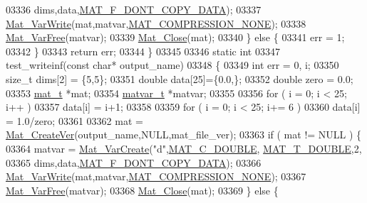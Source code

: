 \begin{DoxyCode}
{{{{{{{{{{{{{{{{{{{{{{{{{{{{{{{{{{{{{{{{{{{{{{{{{{{{{{{{{{{{03336                        dims,data,\hyperlink{group___m_a_t_ggab9d6ef9e3ddca78a317b173f01d53fbba762244499f52eb35e7b53fb79a1f2889}{MAT\_F\_DONT\_COPY\_DATA});
03337         \hyperlink{group___m_a_t_ga4bd3eba12df415d8226e27c457fbbb0b}{Mat\_VarWrite}(mat,matvar,\hyperlink{group___m_a_t_gga768c318af97bd2567758ecb001ceb7f4a2280b97631ff5dd24dec55261dc587b6}{MAT\_COMPRESSION\_NONE});
03338         \hyperlink{group___m_a_t_ga1d14716f7450530fd1c9d02413787f0e}{Mat\_VarFree}(matvar);
03339         \hyperlink{group___m_a_t_ga101c92ff7bde4a2d4615661beba09262}{Mat\_Close}(mat);
03340     \} \textcolor{keywordflow}{else} \{
03341         err = 1;
03342     \}
03343     \textcolor{keywordflow}{return} err;
03344 \}
03345 
03346 \textcolor{keyword}{static} \textcolor{keywordtype}{int}
03347 test\_writeinf(\textcolor{keyword}{const} \textcolor{keywordtype}{char}* output\_name)
03348 \{
03349     \textcolor{keywordtype}{int}        err = 0, i;
03350     \textcolor{keywordtype}{size\_t}     dims[2] = \{5,5\};
03351     \textcolor{keywordtype}{double}     data[25]=\{0.0,\};
03352     \textcolor{keywordtype}{double}     zero = 0.0;
03353     \hyperlink{struct__mat__t}{mat\_t}    *mat;
03354     \hyperlink{group___m_a_t_structmatvar__t}{matvar\_t} *matvar;
03355 
03356     \textcolor{keywordflow}{for} ( i = 0; i < 25; i++ )
03357          data[i] = i+1;
03358 
03359     \textcolor{keywordflow}{for} ( i = 0; i < 25; i+= 6 )
03360         data[i] = 1.0/zero;
03361 
03362     mat = \hyperlink{group___m_a_t_ga22d404f203af7869c841400e7ad247cf}{Mat\_CreateVer}(output\_name,NULL,mat\_file\_ver);
03363     \textcolor{keywordflow}{if} ( mat != NULL ) \{
03364         matvar = \hyperlink{group___m_a_t_ga1c54a84bb4d810c6fccdb8869489eac4}{Mat\_VarCreate}(\textcolor{stringliteral}{"d"},\hyperlink{group___m_a_t_ggad4d60ae7b709fc81bfd744fb4c857c40a5d70e0862e5bdb7bd86bf7ba5948f307}{MAT\_C\_DOUBLE},
      \hyperlink{group___m_a_t_ggacf7b3b879282b7ab3a51190e49bf3453a31e721ecf7e188196f83c32838288797}{MAT\_T\_DOUBLE},2,
03365                        dims,data,\hyperlink{group___m_a_t_ggab9d6ef9e3ddca78a317b173f01d53fbba762244499f52eb35e7b53fb79a1f2889}{MAT\_F\_DONT\_COPY\_DATA});
03366         \hyperlink{group___m_a_t_ga4bd3eba12df415d8226e27c457fbbb0b}{Mat\_VarWrite}(mat,matvar,\hyperlink{group___m_a_t_gga768c318af97bd2567758ecb001ceb7f4a2280b97631ff5dd24dec55261dc587b6}{MAT\_COMPRESSION\_NONE});
03367         \hyperlink{group___m_a_t_ga1d14716f7450530fd1c9d02413787f0e}{Mat\_VarFree}(matvar);
03368         \hyperlink{group___m_a_t_ga101c92ff7bde4a2d4615661beba09262}{Mat\_Close}(mat);
03369     \} \textcolor{keywordflow}{else} \{
}}}}}}}}}}}}}}}}}}}}}}}}}}}}}}}}}}}}}}}}}}}}}}}}}}}}}}}}}}}}
\end{DoxyCode}
